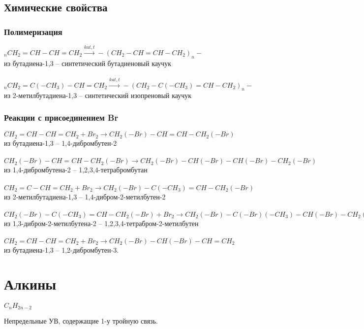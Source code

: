 \documentclass[a4paper]{article}
\begin{document}
\subsection{Химические свойства}
	\subsubsection{Полимеризация}
	$_nCH_{2}=CH-CH=CH_{2} \xrightarrow{kat,t} -(CH_{2}-CH=CH-CH_{2})_n-$\\
	из бутадиена-1,3 -- синтетический бутадиеновый каучук\\\\
	$_nCH_{2}=C(-CH_{3})-CH=CH_2 \xrightarrow{kat,t}
	-(CH_2-C(-CH_3)=CH-CH_2)_n-$\\
	из 2-метилбутадиена-1,3 -- синтетический изопреновый каучук
	\subsubsection{Реакции с присоединением Br}
	$CH_2=CH-CH=CH_2 + Br_2 \xrightarrow{} CH_2(-Br)-CH=CH-CH_2(-Br)$\\
	из бутадиена-1,3 -- 1,4-дибромбутен-2\\\\
	$CH_2(-Br)-CH=CH-CH_2(-Br) \xrightarrow{}
	CH_2(-Br)-CH(-Br)-CH(-Br)-CH_2(-Br)$\\
	из 1,4-дибромбутена-2 -- 1,2,3,4-тетрабромбутан\\\\
	$CH_2=C-CH=CH_2+Br_2 \xrightarrow{} CH_2(-Br)-C(-CH_3)=CH-CH_2(-Br)$\\
	из 2-метилбутадиена-1,3 -- 1,4-дибром-2-метилбутен-2\\\\
	$CH_2(-Br)-C(-CH_3)=CH-CH_2(-Br)+Br_2 \xrightarrow{}
	CH_2(-Br)-C(-Br)(-CH_3)-CH(-Br)-CH_2(-Br)$\\
	из 1,3-дибром-2-метилбутена-2 -- 1,2,3,4-тетрабром-2-метилбутен\\\\
	$CH_2=CH-CH=CH_2+Br_2 \xrightarrow{} CH_2(-Br)-CH(-Br)-CH=CH_2$\\
	из бутадиена-1,3 -- 1,2-дибромбутен-3.
\pagebreak

\section{Алкины} \begin{flushright} $C_{n}H_{2n-2}$ \end{flushright}
Непредельные УВ, содержащие 1-у тройную связь.
\end{document}
